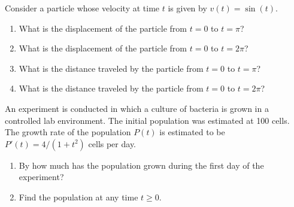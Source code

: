 \documentclass[10pt,t,handout,ignorenonframetext,aspectratio=169]{beamer}
\begin{document}
\begin{frame}
  \vs
  \begingroup
  \small
  \begin{example}
    Consider a particle whose velocity at time $t$ is given by $v(t) = \sin(t)$.
    \begin{enumerate}
    \item What is the displacement of the particle from $t = 0$ to
      $t = \pi$?
    \item What is the displacement of the particle from $t = 0$ to
      $t = 2\pi$?
    \item What is the distance traveled by the particle from $t = 0$ to
      $t = \pi$?
    \item What is the distance traveled by the particle from $t = 0$ to
      $t = 2\pi$?
    \end{enumerate}
  \end{example}
  \endgroup
  \vs
  \hfill
  \begin{minipage}{0.5\linewidth}
    \begin{image}[0.99\linewidth]
    \end{image}
  \end{minipage}
\end{frame}

\begin{frame}
  \vs
  \begingroup
  \small
  \begin{example}
    An experiment is conducted in which a culture of bacteria is grown
    in a controlled lab environment. The initial population was
    estimated at 100 cells. The growth rate of the population $P(t)$ is
    estimated to be $P'(t) = 4/(1+t^2)$ cells per day.
    \begin{enumerate}
    \item By how much has the population grown during the first day of
      the experiment?
    \item Find the population at any time $t\ge0$.
    \end{enumerate}
  \end{example}
  \endgroup
\end{frame}
\end{document}
